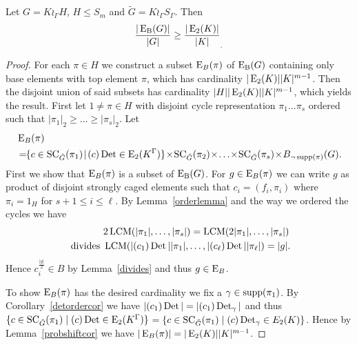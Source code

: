 \begin{lem}\label{concrete}
Let $G=K\wr_\Gamma H$, $H\leq S_m$ and $\tilde{G}=K\wr_\Gamma S_\Gamma$. %
Then \[\frac{|\operatorname{E_{B}}(G)|}{|G|}\geq\frac{|\operatorname{E}_2(K)|}{|K|}_.\]
\end{lem}
\begin{proof}
For each $\pi \in H$ we construct a subset $\operatorname{E}_{B}(\pi)$ of $\operatorname{E_{B}}(G)$ containing only base elements with top element $\pi$, which has cardinality $|\operatorname{E}_2(K)||K|^{m-1}$.
Then the disjoint union of said subsets has cardinality $|H||\operatorname{E}_2(K)||K|^{m-1}$, which yields the result.
First let $1\neq \pi\in H$ with disjoint cycle representation $\pi_1\dots\pi_s$ ordered such that $|\pi_1|_2\geq\dots\geq |\pi_s|_2$. 
Let
\begin{align*}
&\E_{B}(\pi)\\
&=\!\!\{c\in \SC_{\tilde{G}}(\pi_1) \! \mid \! (c)\Det \in \E_2(K^\Gamma)\} \!\times \! \SC_{\tilde{G}}(\pi_2)\! \times \! \dots \! \times \! \SC_{\tilde{G}}(\pi_s) \! \times \! 
B_{\neg \supp(\pi)}(G).\end{align*}
First we show that $\operatorname{E}_{B}(\pi)$ is a subset of $\operatorname{E_{B}}(G)$.
For $g\in \operatorname{E}_{B}(\pi)$ we can write $g$ as product of disjoint strongly caged elements such that $c_i=(f_i,\pi_i)$ where $\pi_i=1_H$ for $s+1\leq i\leq \ell$. 
By Lemma~\ref{orderlemma} and the way we ordered the cycles we have
\begin{align*} &2\operatorname{LCM}(|\pi_1|,\dots,|\pi_s|)=\operatorname{LCM}(2|\pi_1|,\dots,|\pi_s|)\\\text{ divides } &\operatorname{LCM}(|(c_1)\operatorname{Det}||\pi_1|,\dots,|(c_\ell)\operatorname{Det}||\pi_\ell|)=|g|. \end{align*} 
Hence \mbox{$c_i^{\frac{|g|}{2}}\in B$} by Lemma~\ref{divides} and thus $g\in \operatorname{E}_B$.

\begin{sloppypar}
To show $\operatorname{E}_{B}(\pi)$ has the desired cardinality we fix a $\gamma\in \operatorname{supp}(\pi_1)$.
By Corollary~\ref{detordercor} we have $|(c_1)\operatorname{Det}|=|(c_1)\operatorname{Det}_\gamma|$ and thus
\mbox{$\{c\in \operatorname{SC}_{\tilde{G}}(\pi_1) \mid (c)\operatorname{Det} \in \operatorname{E}_2(K^\Gamma)\}$}$=$\mbox{$\{c\in \operatorname{SC}_{\tilde{G}}(\pi_1) \mid (c)\operatorname{Det}_\gamma \in E_2(K)\}$}.
Hence by Lemma~\ref{probshiftcor} we have $|\operatorname{E}_{B}(\pi)|=|\operatorname{E}_2(K)||K|^{m-1}$.


\end{sloppypar}
\end{proof}
